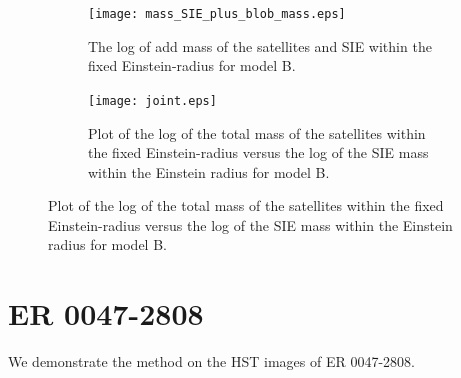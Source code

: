 \documentclass[useAMS,usenatbib]{mn2e}
\begin{document}
\begin{figure}
\hspace{10pt}
\begin{subfigure}{.5\textwidth}
\vspace{-12pt}
  \centering
  \texttt{[image: mass\_SIE\_plus\_blob\_mass.eps]}
\parbox{0.8\linewidth}{\caption{The log of add mass of the satellites and SIE within the fixed Einstein-radius for model B.   \label{fig:sub5}}}
\end{subfigure}
\begin{subfigure}{.5\textwidth}
  \centering
  \texttt{[image: joint.eps]}
\parbox{0.8\linewidth}{\caption{Plot of the log of the total mass of the satellites within the fixed Einstein-radius versus the 
log of the SIE mass within the Einstein radius for model B.  \label{fig:sub6} }}
\end{subfigure}

   \end{figure}

  
  

\section{ER 0047-2808}
We demonstrate the method on the HST images of ER 0047-2808.
\end{document}
